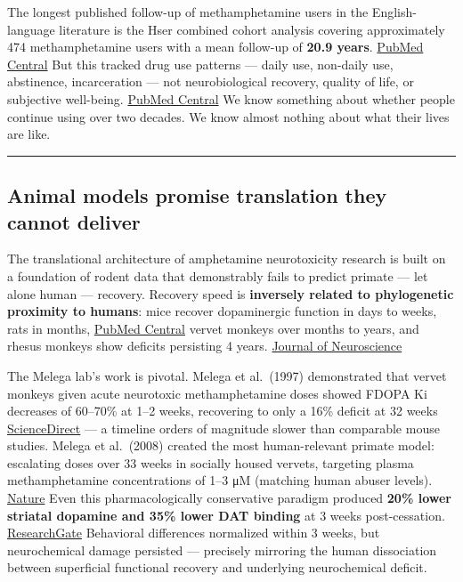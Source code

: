 The longest published follow-up of methamphetamine users in the English-language literature is the Hser combined cohort analysis covering approximately 474 methamphetamine users with a mean follow-up of \textbf{20.9 years}. \href{https://pmc.ncbi.nlm.nih.gov/articles/PMC4072125/}{PubMed Central} But this tracked drug use patterns --- daily use, non-daily use, abstinence, incarceration --- not neurobiological recovery, quality of life, or subjective well-being. \href{https://pmc.ncbi.nlm.nih.gov/articles/PMC4072125/}{PubMed Central} We know something about whether people continue using over two decades. We know almost nothing about what their lives are like.

\begin{center}\rule{0.5\linewidth}{0.5pt}\end{center}

\subsection{Animal models promise translation they cannot deliver}\label{14_what_we_dont_know-animal-models-promise-translation-they-cannot-deliver}

The translational architecture of amphetamine neurotoxicity research is built on a foundation of rodent data that demonstrably fails to predict primate --- let alone human --- recovery. Recovery speed is \textbf{inversely related to phylogenetic proximity to humans}: mice recover dopaminergic function in days to weeks, rats in months, \href{https://pmc.ncbi.nlm.nih.gov/articles/PMC3261322/}{PubMed Central} vervet monkeys over months to years, and rhesus monkeys show deficits persisting 4 years. \href{https://www.jneurosci.org/content/21/23/9414}{Journal of Neuroscience}

The Melega lab's work is pivotal. Melega et al.~(1997) demonstrated that vervet monkeys given acute neurotoxic methamphetamine doses showed FDOPA Ki decreases of 60--70\% at 1--2 weeks, recovering to only a 16\% deficit at 32 weeks \href{https://www.sciencedirect.com/science/article/abs/pii/S0006899397005489}{ScienceDirect} --- a timeline orders of magnitude slower than comparable mouse studies. Melega et al.~(2008) created the most human-relevant primate model: escalating doses over 33 weeks in socially housed vervets, targeting plasma methamphetamine concentrations of 1--3 μM (matching human abuser levels). \href{https://www.nature.com/articles/1301502}{Nature} Even this pharmacologically conservative paradigm produced \textbf{20\% lower striatal dopamine and 35\% lower DAT binding} at 3 weeks post-cessation. \href{https://www.researchgate.net/publication/6211685_Long-Term_Methamphetamine_Administration_in_the_Vervet_Monkey_Models_Aspects_of_a_Human_Exposure_Brain_Neurotoxicity_and_Behavioral_Profiles}{ResearchGate} Behavioral differences normalized within 3 weeks, but neurochemical damage persisted --- precisely mirroring the human dissociation between superficial functional recovery and underlying neurochemical deficit.

